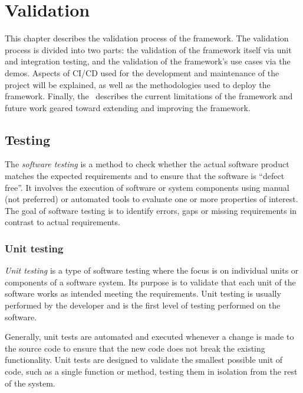 \chapter{Validation} %
\label{chap:validation}

This chapter describes the validation process of the framework. The validation process is divided into two parts: the validation of the framework
itself via unit and integration testing, and the validation of the framework's use cases via the demos.
Aspects of CI/CD used for the development and maintenance of the project will be explained, as well as the methodologies used to deploy the framework.
Finally, the~ describes the current limitations of the framework and future work geared toward extending and
improving the framework.

\section{Testing}
\label{sec:testing}

The \emph{software testing} is a method to check whether the actual software product matches the expected requirements and to ensure that the
software is ``defect free''. It involves the execution of software or system components using manual (not preferred) or automated tools to evaluate
one or more properties of interest. The goal of software testing is to identify errors, gaps or missing requirements in contrast to actual
requirements.

\subsection{Unit testing}
\label{sec:unit-testing}

\emph{Unit testing} is a type of software testing where the focus is on individual units or components of a software system.
Its purpose is to validate that each unit of the software works as intended meeting the requirements. Unit testing is usually performed by the
developer and is the first level of testing performed on the software.

Generally, unit tests are automated and executed whenever a change is made to the source code to ensure that the new code does not break the existing
functionality. Unit tests are designed to validate the smallest possible unit of code, such as a single function or method, testing them in
isolation from the rest of the system.

